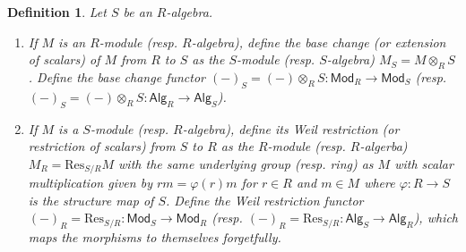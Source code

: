 \documentclass[10pt]{book}
\theoremstyle{bookplain}
\theoremstyle{bookdefinition}
\newtheorem{definition}[theorem]{Definition}
\theoremstyle{bookremark}
\begin{document}
\begin{definition}Let $S$ be an $R$-algebra. 
    \begin{enumerate}
        \item If $M$ is an $R$-module (resp. $R$-algebra), define the \textit{base change} (or \textit{extension of scalars}) of $M$ from $R$ to $S$ as the $S$-module (resp. $S$-algebra) $M_S=M\otimes_R S$. Define the \textit{base change functor} $(-)_S=(-)\otimes_{R}S:\mathsf{Mod}_{R}\rightarrow \mathsf{Mod}_{S}$ (resp. $(-)_S=(-)\otimes_{R}S:\mathsf{Alg}_{R}\rightarrow \mathsf{Alg}_{S}$).
        \item If $M$ is a $S$-module (resp. $R$-algebra), define its \textit{Weil restriction} (or \textit{restriction of scalars}) from $S$ to $R$ as the $R$-module (resp. $R$-algerba) $M_R=\mathrm{Res}_{S/R} M$ with the same underlying group (resp. ring) as $M$ with scalar multiplication given by $rm=\varphi(r)m$ for $r\in R$ and $m\in M$ where $\varphi:R\rightarrow S$ is the structure map of $S$. Define the \textit{Weil restriction functor} $(-)_R=\mathrm{Res}_{S/R}:\mathsf{Mod}_{S}\rightarrow \mathsf{Mod}_{R}$ (resp. $(-)_R=\mathrm{Res}_{S/R}:\mathsf{Alg}_{S}\rightarrow \mathsf{Alg}_{R}$), which maps the morphisms to themselves forgetfully. 
    \end{enumerate}
\end{definition}
\end{document}
